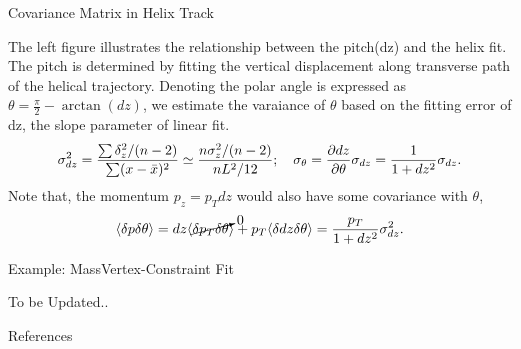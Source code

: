 \documentclass[
	xcolor=dvipsnames,
	aspectratio=169,	
	10pt, 
	]{beamer}
\begin{document}
\begin{frame}{Covariance Matrix in Helix Track}
	\begin{block}{}
		{
			The left figure illustrates the relationship between the pitch(dz) and the helix fit. The pitch is determined by fitting the vertical displacement along transverse path of the helical trajectory. Denoting the polar angle is expressed as 
		}
$\theta = \frac{\pi}{2}-\arctan(dz)$, we estimate the varaiance of $\theta$ based on the fitting error of dz, the slope parameter of linear fit.
		\begin{align*}
			\sigma_{dz}^2 =\frac{\sum\delta_z^2/(n-2) }{\sum(x-\bar x)^2} \simeq \frac{n \sigma_z^2/(n-2)}{n L^2/12};\quad \sigma_\theta = \frac{\partial dz}{\partial \theta}\sigma_{dz}=\frac{1}{1+dz^2}\sigma_{dz}.
		\end{align*}
		Note that, the momentum $p_z=p_T dz$ would also have some covariance with $\theta$,
		\begin{align*}
			\langle \delta p\delta \theta\rangle = dz\langle  \cancelto{0}{\delta p_T  \delta \theta}\rangle+	p_T\langle \delta dz \delta \theta\rangle =\frac{p_T}{1+dz^2}\sigma_{dz}^2.
		\end{align*}
	
	\end{block}
\end{frame}
\begin{frame}{Example: MassVertex-Constraint Fit}
	\begin{block}{}
To be Updated..
	\end{block}
\end{frame}
\begin{frame}{References}
	 	\printbibliography
\end{frame}
\end{document}
